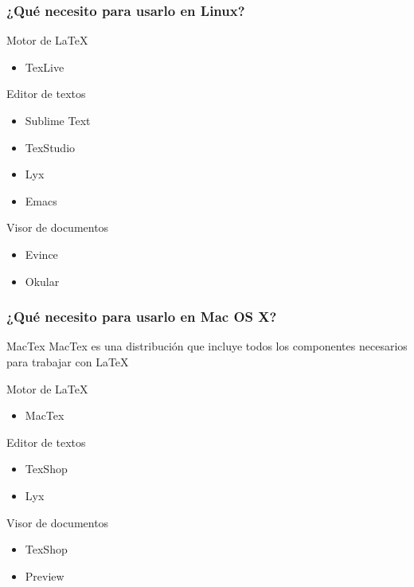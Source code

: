 \documentclass[12pt]{beamer}
\begin{document}
\begin{frame}%
  \frametitle{¿Qué necesito para usarlo en Linux?}
  \begin{block}{Motor de \textrm{\LaTeX{}}}
    \begin{itemize}
    \item TexLive
    \end{itemize}
  \end{block}
  \begin{block}{Editor de textos}
    \begin{itemize}
    \item Sublime Text
    \item TexStudio
    \item Lyx
    \item Emacs
    \end{itemize}
  \end{block}
  \begin{block}{Visor de documentos}
    \begin{itemize}
    \item Evince
    \item Okular
    \end{itemize}
  \end{block}
\end{frame}

\begin{frame}%
  \frametitle{¿Qué necesito para usarlo en Mac OS X?}
  \begin{block}{MacTex}
    MacTex es una distribución que incluye todos los componentes necesarios para trabajar con \textrm{\LaTeX{}}
  \end{block}
  \begin{block}{Motor de \textrm{\LaTeX{}}}
    \begin{itemize}
    \item MacTex
    \end{itemize}
  \end{block}
  \begin{block}{Editor de textos}
    \begin{itemize}
    \item TexShop
    \item Lyx
    \end{itemize}
  \end{block}
  \begin{block}{Visor de documentos}
    \begin{itemize}
    \item TexShop
    \item Preview
    \end{itemize}
  \end{block}
\end{frame}
\end{document}
